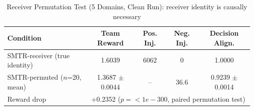 \begin{table}[t]
\caption{Receiver Permutation Test (5 Domains, Clean Run): receiver identity is causally necessary}
\label{tab:final_receiver_permutation}
\centering
\begin{tabular}{l c c c c}
\toprule
Condition & Team Reward & Pos. Inj. & Neg. Inj. & Decision Align. \\
\midrule
SMTR-receiver (true identity) & 1.6039 & 6062 & 0 & 1.0000 \\
SMTR-permuted ($n$=20, mean) & 1.3687 $\pm$ 0.0044 & -- & 36.6 & 0.9239 $\pm$ 0.0014 \\
\midrule
Reward drop & \multicolumn{4}{c}{+0.2352 ($p = <1e-300$, paired permutation test)} \\
\bottomrule
\end{tabular}
\end{table}
